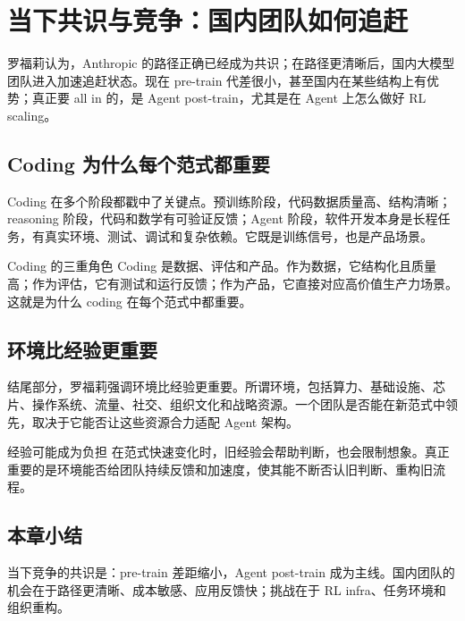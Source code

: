 \section{当下共识与竞争：国内团队如何追赶}

罗福莉认为，Anthropic 的路径正确已经成为共识；在路径更清晰后，国内大模型团队进入加速追赶状态。现在 pre-train 代差很小，甚至国内在某些结构上有优势；真正要 all in 的，是 Agent post-train，尤其是在 Agent 上怎么做好 RL scaling。

\subsection{Coding 为什么每个范式都重要}

Coding 在多个阶段都戳中了关键点。预训练阶段，代码数据质量高、结构清晰；reasoning 阶段，代码和数学有可验证反馈；Agent 阶段，软件开发本身是长程任务，有真实环境、测试、调试和复杂依赖。它既是训练信号，也是产品场景。

\begin{importantbox}{Coding 的三重角色}
Coding 是数据、评估和产品。作为数据，它结构化且质量高；作为评估，它有测试和运行反馈；作为产品，它直接对应高价值生产力场景。这就是为什么 coding 在每个范式中都重要。
\end{importantbox}

\subsection{环境比经验更重要}

结尾部分，罗福莉强调环境比经验更重要。所谓环境，包括算力、基础设施、芯片、操作系统、流量、社交、组织文化和战略资源。一个团队是否能在新范式中领先，取决于它能否让这些资源合力适配 Agent 架构。

\begin{warningbox}{经验可能成为负担}
在范式快速变化时，旧经验会帮助判断，也会限制想象。真正重要的是环境能否给团队持续反馈和加速度，使其能不断否认旧判断、重构旧流程。
\end{warningbox}

\subsection{本章小结}

当下竞争的共识是：pre-train 差距缩小，Agent post-train 成为主线。国内团队的机会在于路径更清晰、成本敏感、应用反馈快；挑战在于 RL infra、任务环境和组织重构。

